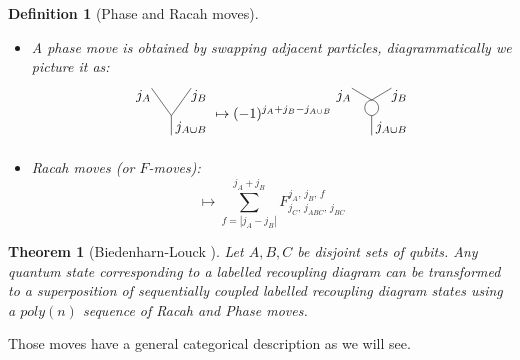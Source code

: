 \documentclass{article}
\newtheorem{definition}{Definition}
\newtheorem{theorem}{Theorem}
\begin{document}
\begin{definition}[Phase and Racah moves]
	\begin{itemize}
		\item A phase move is obtained by swapping adjacent particles, diagrammatically we picture it as:
		\begin{equation}
		\begin{gathered}
		\begin{tikzpicture}
		\node (0) at (0.5, -0.3) {$j_{A\cup B}$};
		\node (0) at (-0.7, 0.5) {$j_A$};
		\node (0) at (0.7, 0.5) {$j_B$};
		\draw (-0.5, 0.7)--(0,0)--(0,-0.5);
		\draw (0.5, 0.7)--(0,0);
		\end{tikzpicture}
		\end{gathered}
		\mapsto
		(-1)^{j_A+j_B-j_{A \cup B}}
		\begin{gathered}
		\begin{tikzpicture}
		\node (0) at (0.5, -0.3) {$j_{A\cup B}$};
		\node (0) at (-0.7, 0.5) {$j_A$};
		\node (0) at (0.7, 0.5) {$j_B$};
		\draw [bend right=80, looseness=1.5] (0,0) to (0,0.4);
		\draw [bend left=80, looseness=1.5] (0,0) to (0,0.4);
		\draw (0,0)--(0,-0.5);
		\draw (0.5, 0.7)--(0,0.4)--(-0.5, 0.7);
		\end{tikzpicture}
		\end{gathered}
		\end{equation}
		\item Racah moves (or $F$-moves):
		\begin{equation}
		\mapsto \sum_{f = |j_A - j_B|}^{j_A+j_B}  F^{j_A,\, j_B, \, f}_{j_C, \, j_{ABC}, \, j_{BC}} 
		\end{equation}
	\end{itemize}
\end{definition}
\begin{theorem}[Biedenharn-Louck \cite{Aquilanti09}] 
	Let $A,B,C$ be disjoint sets of qubits.
	Any quantum state corresponding to a labelled recoupling diagram can be transformed to a superposition of sequentially coupled labelled recoupling diagram states using a $poly(n)$ sequence of Racah and Phase moves.
\end{theorem}
Those moves have a general categorical description as we will see.
\end{document}
